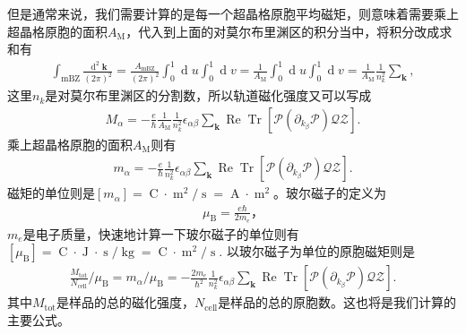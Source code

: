 \documentclass[10pt, oneside]{article}
\begin{document}
但是通常来说，我们需要计算的是每一个超晶格原胞平均磁矩，则意味着需要乘上超晶格原胞的面积\(A_{\mathrm{M}}\)，代入到上面的对莫尔布里渊区的积分当中，将积分改成求和有
\begin{align}
	\int_{\mathrm{mBZ}} \frac{\operatorname{d}^{2} \bm{k}}{ \left( 2 \pi\right)^2} = \frac{A_{\mathrm{mBZ}}}{\left( 2 \pi\right)^{2}} \int^{1}_{0} \operatorname{d} u \int_{0}^{1} \operatorname{d} v = \frac{1}{A_{\mathrm{M}}} \int_{0}^{1}  \operatorname{d} u \int_{0}^{1} \operatorname{d} v = \frac{1}{A_{\mathrm{M}}} \frac{1}{n_{k}^{2}} \sum_{\bm{k}},
\end{align}
这里\(n_{k}\)是对莫尔布里渊区的分割数，所以轨道磁化强度又可以写成
\begin{align}
	M_{\alpha} = - \frac{e}{\hbar} \frac{1}{A_{\mathrm{M }}} \frac{1}{n_{k }^{2}} \epsilon_{\alpha \beta} \sum_{\bm{k}} \operatorname{Re} \operatorname{Tr} \left[\mathcal{P} \left(\partial_{k_{\beta}} \mathcal{P}\right) \mathcal{Q} \mathcal{Z}\right].
\end{align}
乘上超晶格原胞的面积\(A_{\mathrm{M }}\)则有
\begin{align}
	\boxed{
		m_{\alpha} =  - \frac{e}{\hbar} \frac{1}{n_{k}^{2}} \epsilon_{\alpha \beta} \sum_{\bm{k}} \operatorname{Re} \operatorname{Tr} \left[\mathcal{P} \left(\partial_{k_{\beta}} \mathcal{P}\right) \mathcal{Q} \mathcal{Z}\right].
	}
\end{align}
磁矩的单位则是\(\left[m_{\alpha}\right] = \operatorname{C} \cdot \operatorname{m }^{2} /\operatorname{s} = \operatorname{A } \cdot \operatorname{m}^{2}\)。玻尔磁子的定义为
\begin{align}
	\mu_{\mathrm{B }} = \frac{e \hbar}{ 2 m_{e}}，
\end{align}
\(m_{e }\)是电子质量，快速地计算一下玻尔磁子的单位则有\(\left[\mu_{\mathrm{B }}\right] = \operatorname{C } \cdot \operatorname{J} \cdot \operatorname{s} / \operatorname{ kg} = \operatorname{C} \cdot \operatorname{m }^{2} /\operatorname{s}\). 以玻尔磁子为单位的原胞磁矩则是
\begin{align}
	\boxed{
		\frac{M_{\mathrm{tot}}}{N_{\mathrm{cell}}} / \mu_{\mathrm{B }} =  m_{\alpha}/\mu_{\mathrm{B}} = - \frac{2 m_{e }}{\hbar^{2}} \frac{1}{n_{k }^{2}} \epsilon_{\alpha \beta} \sum_{\bm{k}} \operatorname{Re} \operatorname{Tr} \left[\mathcal{P} \left(\partial_{k_{\beta}} \mathcal{P}\right) \mathcal{Q} \mathcal{Z}\right].
	}
\end{align}
其中\(M_{\mathrm{tot}}\)是样品的总的磁化强度，\(N_{\mathrm{cell}}\)是样品的总的原胞数。这也将是我们计算的主要公式。
\end{document}
